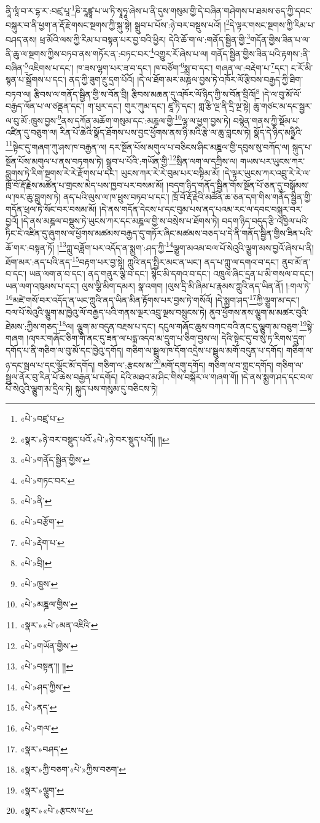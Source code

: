 ནཱི་ལཱཾ་བ་ར་དྷ་ར་:བཛྲ་པཱ་\footnote{«པེ་»བཛྲ་པ་}ཎི་རཱཛྙཱ་པ་ཡ་ཏི་སྭཱཧཱ་ཞེས་པ་ནི་དུས་གསུམ་གྱི་དེ་བཞིན་གཤེགས་པ་ཐམས་ཅད་ཀྱི་དབང་བསྐུར་བ་ནི་ཕྱག་ན་རྡོ་རྗེ་གསང་སྔགས་ཀྱི་སྐུ་སྟེ། སྒྲུབ་པ་པོས་:ཉེ་བར་བསྡུས་པའོ། །\footnote{«སྣར་»ཉེ་བར་བསྡུད་པའོ་«པེ་»ཉེ་བར་སྡུད་པའོ།། །།}དེ་ལྟར་གསང་སྔགས་ཀྱི་རིམ་པ་བཤད་ནས། ཕྲ་མོའི་ལས་ཀྱི་རིམ་པ་བསྟན་པར་བྱ་བའི་ཕྱིར། དེའི་ཆོ་ག་ལ་:གནོད་སྦྱིན་གྱི་\footnote{«པེ་»གནོད་སྦྱིན་གྱིས་}གདོན་གྱིས་ཟིན་པ་ལ་ནི་ཆུ་ལ་སྔགས་ཀྱིས་བཏབ་ནས་གཏོར་ན་:བཏང་བར་\footnote{«པེ་»གཏང་བར་}འགྱུར་རོ་ཞེས་པ་ལ། གནོད་སྦྱིན་གྱིས་ཟིན་པའི་རྟགས་:ནི་བཞིན་\footnote{«པེ་»ནི་}འཇིགས་པ་དང་། ཁ་ཟས་ལྷག་པར་ཟ་བ་དང་། ཁ་བཙོག་\footnote{«པེ་»བརྩོག་}སྨྲ་བ་དང་། གཞན་ལ་:བརྡེག་པ་\footnote{«པེ་»རྡེག་པ་}དང་། ང་རོ་མི་སྙན་པ་སྒྲོགས་པ་དང་། ནད་ཀྱི་ཟུག་རྔུ་དྲག་པོའོ། །དེ་ལ་ཐོག་མར་མཎྜལ་བྱས་ཏེ་འཁོར་ལོ་རྩིབས་བརྒྱད་ཀྱི་ཐིག་བཏབ་ལ། རྩིབས་ལ་གནོད་སྦྱིན་གྱི་ས་བོན་བྲི། རྩིབས་མཆན་དུ་འཁོར་ལོ་ཉིད་ཀྱི་ས་བོན་བྲིའོ།\footnote{«པེ་»བྲི།} །དེ་ལ་བུ་མོ་ལོ་བརྒྱད་ལོན་པ་ལ་ཙནྡན་དང་། ག་པུར་དང་། གུར་ཀུམ་དང་། ཛཱ་ཏི་དང་། གླ་རྩི་ལྔ་ནི་དྲི་ལྔ་སྟེ། ཆུ་གཙང་མ་དང་སྦྱར་ལ་བུ་མོ་:ཁྲུས་བྱས་\footnote{«པེ་»ཁྲུས་}ནས་དཀོན་མཆོག་གསུམ་དང་:མཎྜལ་གྱི་\footnote{«པེ་»མཎྜལ་གྱིས་}ལྷ་ལ་ཕྱག་བྱས་ཏེ། བསྙེན་གནས་ཀྱི་སྡོམ་པ་འཛིན་དུ་བཅུག་ལ། རིན་པོ་ཆེའི་སྣོད་ཐོགས་པས་བྱང་ཕྱོགས་ནས་ཉི་མའི་རྩེ་ལ་ཆུ་བླངས་ཏེ། སྣོད་དེ་ཉིད་མཉྫིའི་\footnote{«སྣར་»«པེ་»མན་འཇིའི་}སྟེང་དུ་གཞག་ཀུ་ཤས་ཁ་བརྒྱན་ལ། དར་སྔོན་པོས་མགུལ་པ་བཅིངས་ཤིང་མཎྜལ་གྱི་དབུས་སུ་བཀོད་ལ། སྐུད་པ་སྔོན་པོས་མགུལ་པ་ནས་བཏགས་ཏེ། སྒྲུབ་པ་པོའི་:གཡོན་གྱི་\footnote{«པེ་»གཡོན་གྱིས་}སྲིན་ལག་ལ་དཀྲིས་ལ། གཡས་པར་ཡུངས་ཀར་བླུགས་ཏེ་རིག་སྔགས་རེ་རེ་རྫོགས་པ་དང་། ཡུངས་ཀར་རེ་རེ་བུམ་པར་བསྟིམ་མོ། །དེ་ལྟར་ཡུངས་ཀར་འབྲུ་རེ་རེ་ལ་ཁྲོ་བོ་རྡོ་རྗེས་མཚོན་པ་གྲངས་མེད་པས་ཁྱབ་པར་བསམ་མོ། །བདག་ཉིད་གནོད་སྦྱིན་གོས་སྔོན་པོ་ཅན་དུ་བསྒོམས་ལ་ཁར་ཆུ་བླུགས་ཏེ། ནད་པའི་ལུས་ལ་ཁ་ཕྲུས་བཏབ་པ་དང་། ཁྲོ་བོ་རྡོ་རྗེའི་མཚོན་ཆ་ཅན་དག་གིས་གནོད་སྦྱིན་གྱི་གདོན་ཕྲལ་ཏེ་སོང་བར་བསམ་མོ། །དེ་ནས་གདོན་དེངས་པ་དང་བུམ་པས་ནད་པའམ་རང་ལ་དབང་བསྐུར་བར་བྱའོ། །དེ་ནས་མཎྜལ་བསྡུས་ཏེ་ཡུངས་ཀར་དང་མཎྜལ་གྱི་ས་བསྲེས་པ་ཐོགས་ཏེ། བདག་ཉིད་བདུད་རྩི་འཁྱིལ་པའི་ཏིང་ངེ་འཛིན་དུ་ཞུགས་ལ་ཕྱོགས་མཚམས་བརྒྱད་དུ་གཏོར་ཞིང་མཚམས་བཅད་པ་དེ་ནི་གནོད་སྦྱིན་གྱིས་ཟིན་པའི་ཆོ་གར་:བསྟན་ཏོ། །\footnote{«པེ་»བསྟན་།། །།}ཀླུ་བཟློག་པར་འདོད་ན་སྨྱག་:ཤད་ཀྱི་\footnote{«པེ་»ཤད་ཀྱིས་}ལྕུག་མའམ་བལ་པོ་སེའུའི་ལྕུག་མས་བྱའོ་ཞེས་པ་ནི། ཐོག་མར་:ནད་པའི་ནད་\footnote{«པེ་»ནད་}བརྟག་པར་བྱ་སྟེ། ཀླུའི་ནད་སྤྱིར་མང་ན་ཡང་། ནད་པ་ཀླུ་ལ་དགའ་བ་དང་། ནུབ་མོ་ན་བ་དང་། ཡན་ལག་ན་བ་དང་། ནད་གནུར་ལྕི་བ་དང་། སྙིང་མི་དགའ་བ་དང་། འཁྲུལ་ཞིང་དྲན་པ་མི་གསལ་བ་དང་། ཡན་ལག་འཁུམས་པ་དང་། ལུས་ལྕི་མིག་དམར། སྣ་འགག །ལུས་དྲི་མི་ཞིམ་པ་རྣམས་ཀླུའི་ནད་ཡིན་ནོ། །:གལ་ཏེ་\footnote{«པེ་»གལ་}མཛེ་གསོ་བར་འདོད་ན་ཡང་ཀླུའི་ནད་ཡིན་མིན་རྟོགས་པར་བྱས་ཏེ་གསོའོ། །དེ་སྨྱག་ཤད་\footnote{«སྣར་»བཤད་}ཀྱི་ལྕུག་མ་དང་། བལ་པོ་སེའུའི་ལྕུག་མ་ཁྱེའུ་ལོ་བརྒྱད་པའི་གནས་ལྔར་འབྲུ་ལྔས་བསྲུངས་ཏེ། ནུབ་ཕྱོགས་ནས་ལྕུག་མ་མཚར་བུའི་ཐེམས་:ཀྱིས་གཅད་\footnote{«སྣར་»ཀྱི་བཅག་«པེ་»ཀྱིས་བཅག་}ལ། ལྕུག་མ་བདུན་བརྔས་པ་དང་། དངུལ་གཞོང་ཆུས་བཀང་བའི་ནང་དུ་ལྕུག་མ་བཅུག་\footnote{«སྣར་»ལྕུག་}སྟེ་གཞག །འཁར་གཞོང་ཅིག་གི་ནང་དུ་ཟན་ལ་པདྨ་འདབ་མ་དྲུག་པ་ཅིག་བྱས་ལ། དེའི་སྟེང་དུ་བ་སུ་ཏ་རིགས་དྲུག་དགོད་པ་ནི་གཅིག་ལ་བུ་མོ་དང་ཁྱེའུ་དགོད། གཅིག་ལ་སྦྲུལ་ཁ་དོག་འདྲེས་པ་སྦྲུལ་མགོ་བདུན་པ་དགོད། གཅིག་ལ་ཉ་དང་སྦལ་པ་དང་ལྕོང་མོ་དགོད། གཅིག་ལ་:རྩངས་མ་\footnote{«སྣར་»«པེ་»རྩངས་པ་}མགོ་དགུ་དགོད། གཅིག་ལ་བ་གླང་དགོད། གཅིག་ལ་སྦྲུལ་ནོར་བུ་རིན་པོ་ཆེས་བརྒྱན་པ་དགོད། དེའི་མཐའ་མ་ཤིང་གིས་བསྐོར་ལ་གཞག་གོ། །དེ་ནས་སྨྱག་ཤད་དང་བལ་པོ་སེའུའི་ལྕུག་མ་དྲིལ་ཏེ། སྐུད་པས་གསུམ་དུ་བཅིངས་ཏེ། 